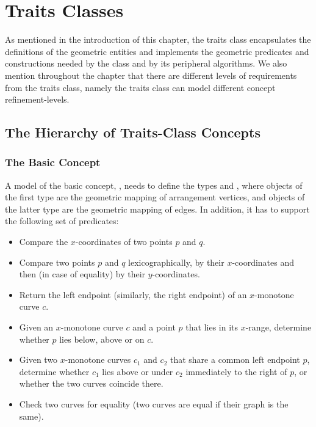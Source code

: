 \section{Traits Classes\label{arr_sec:traits}}

As mentioned in the introduction of this chapter, the traits class
encapsulates the definitions of the geometric entities and
implements the geometric predicates and constructions needed by
the  class and by its peripheral algorithms. We also
mention throughout the chapter that there are different levels of
requirements from the traits class, namely the traits class can model
different concept refinement-levels.

\subsection{The Hierarchy of Traits-Class Concepts
\label{arr_sssec:tr_concepts}}

\subsubsection{The Basic Concept
\label{arr_sssec:tr_basic_concept}}

A model of the basic concept, ,
needs to define the types  and
, where objects of the first type are
the geometric mapping of arrangement vertices, and objects of the
latter type are the geometric mapping of edges. In addition, it has to
support the following set of predicates:
\begin{itemize}
\item Compare the $x$-coordinates of two points $p$ and $q$.
%
\item Compare two points $p$ and $q$ lexicographically, by their
$x$-coordinates and then (in case of equality) by their
$y$-coordinates.
%
\item Return the left endpoint (similarly, the right endpoint) of
an $x$-monotone curve $c$.
%
\item Given an $x$-monotone curve $c$ and a point $p$ that lies in its
$x$-range, determine whether $p$ lies below, above or on $c$.
%
\item Given two $x$-monotone curves $c_1$ and $c_2$ that share a
common left endpoint $p$, determine whether $c_1$ lies above or under
$c_2$ immediately to the right of $p$, or whether the two curves coincide
there.
\item Check two curves for equality (two curves are equal if their
graph is the same).
\end{itemize}

